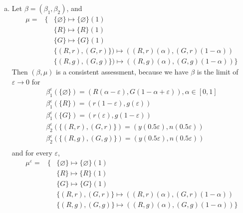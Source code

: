 \documentclass[a4paper,12pt]{article}
\begin{document}
\begin{enumerate}
\begin{enumerate}[(a)]
\item
Let $\beta=(\beta_1,\beta_2)$, and
    \begin{displaymath}
    \begin{array}{lll}
        \mu= & \{ & \{\varnothing\} \mapsto \{\varnothing\}(1)\\
             &    & \{R\} \mapsto \{R\}(1)\\
             &    & \{G\} \mapsto \{G\}(1)\\
             &    & \{(R,r),(G,r)\}) \mapsto ((R,r)(\alpha),(G,r)(1-\alpha))\\
             &    & \{(R,g),(G,g)\}) \mapsto ((R,g)(\alpha),(G,g)(1-\alpha))\}
    \end{array}
    \end{displaymath}
Then $(\beta,\mu)$ is a consistent assessment, because we have $\beta$ is the limit of $\varepsilon \rightarrow 0$ for
    \begin{displaymath}
    \begin{array}{l}
        \beta_1^\varepsilon(\{\varnothing\})=(R(\alpha-\varepsilon),G(1-\alpha+\varepsilon)), \alpha \in [0,1]\\
        \beta_1^\varepsilon(\{R\})=(r(1-\varepsilon),g(\varepsilon))\\
        \beta_1^\varepsilon(\{G\})=(r(\varepsilon),g(1-\varepsilon))\\
        \beta_2^\varepsilon(\{(R,r),(G,r)\})=(y(0.5\varepsilon),n(0.5\varepsilon))\\
        \beta_2^\varepsilon(\{(R,g),(G,g)\})=(y(0.5\varepsilon),n(0.5\varepsilon))\\
    \end{array}
    \end{displaymath}
and for every $\varepsilon$,
    \begin{displaymath}
    \begin{array}{lll}
        \mu^\varepsilon= & \{ & \{\varnothing\} \mapsto \{\varnothing\}(1)\\
             &    & \{R\} \mapsto \{R\}(1)\\
             &    & \{G\} \mapsto \{G\}(1)\\
             &    & \{(R,r),(G,r)\} \mapsto ((R,r)(\alpha),(G,r)(1-\alpha))\\
             &    & \{(R,g),(G,g)\} \mapsto ((R,g)(\alpha),(G,g)(1-\alpha))\}
    \end{array}
    \end{displaymath}


\end{enumerate}
\end{enumerate}
\end{document}
